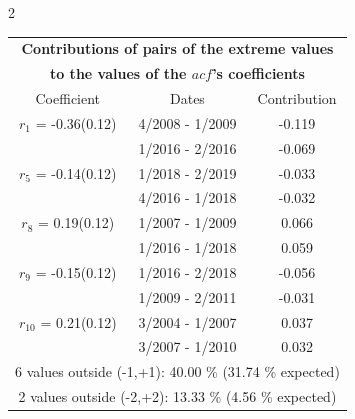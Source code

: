 
\thispagestyle{empty}
\begin{multicols}{2}{ 
\begin{tabular}{ccc}
\multicolumn{3}{c}{\textbf{Contributions of pairs of the extreme values} }  \vspace{-.10in}  \\ 
\multicolumn{3}{c}{ \textbf{to the values of the $acf$'s coefficients}} \\ 
\hline 
\hline                  Coefficient  &  Dates &  Contribution \\ 
\hline 
  $r_{ 1}$ = -0.36(0.12) &       4/2008 -  1/2009 &       -0.119    \vspace{-.10in} \\ 
  &        1/2016 -  2/2016 &       -0.069  \vspace{-.02in}   \\ \hline 
    $r_{ 5}$ = -0.14(0.12) &       1/2018 -  2/2019 &       -0.033    \vspace{-.10in} \\ 
  &        4/2016 -  1/2018 &       -0.032  \vspace{-.02in}   \\ \hline 
    $r_{ 8}$ = 0.19(0.12) &       1/2007 -  1/2009 &        0.066   \vspace{-.10in} \\  
&        1/2016 -  1/2018 &        0.059  \vspace{-.02in} \\ \hline 
  $r_{ 9}$ = -0.15(0.12) &       1/2016 -  2/2018 &       -0.056    \vspace{-.10in} \\ 
  &        1/2009 -  2/2011 &       -0.031  \vspace{-.02in}   \\ \hline 
    $r_{10}$ = 0.21(0.12) &       3/2004 -  1/2007 &        0.037   \vspace{-.10in} \\  
&        3/2007 -  1/2010 &        0.032  \vspace{-.02in} \\ \hline 
\multicolumn{3}{c}{               6 values outside (-1,+1): 40.00  \% (31.74  \% expected)}\vspace{-.10in} \\ 
\multicolumn{3}{c}{               2 values outside (-2,+2): 13.33 \%  (4.56 \% expected) } \\
 \end{tabular} \\ 
 } 
\end{multicols} 
